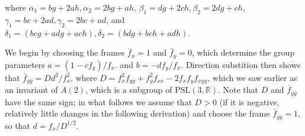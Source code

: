 \documentclass[review,onefignum,onetabnum]{siamonline190516}
\def\R{\mathbb{R}}
\begin{document}
{\noindent where $\alpha_1 = b g + 2 a h, \alpha_2 = 2 b g + a h$, $\beta_1 = d g + 2 c h, \beta_2 = 2 d g + c h$, $\gamma_1 = b c + 2 a d, \gamma_2= 2 b c + a d$, and $\delta_1 = (b c g+a d g+a c h), \delta_2 = (b d g+b c h+a d h)$.


We begin by choosing the frames $\bar f_{\bar x} = 1$ and $\bar f_{\bar y}=  0$, which determine the group parameters $a = (1-c f_y)/f_x.$ and $b = -d f_y/f_x$. Direction substition then shows that $\bar f_{\bar y \bar y} = D d^2 / f_x^2$, where $D = f_{x}^2 f_{yy} + f_y^2 f_{xx} - 2 f_x f_y f_{xyy}$, which we saw earlier as an invariant of $A(2)$, which is a subgroup of $\mathrm{PSL}(3,\R)$. Note that $D$ and $\bar f_{\bar y \bar y}$ have the same sign; in what follows we assume that $D>0$ (if it is negative, relatively little changes in the following derivation) and choose the frame $\bar f_{ \bar y \bar y} = 1$, so that $d = f_x/D^{1/2}.$

}
\end{document}
